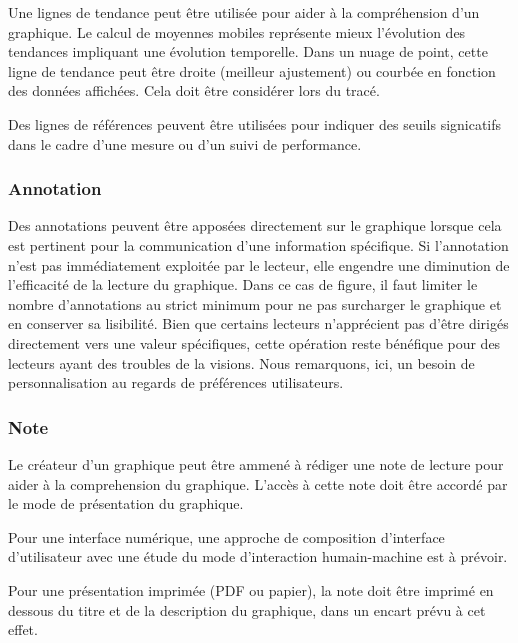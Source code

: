 \documentclass[a4paper,12pt]{article}
\begin{document}
\begin{multicols}{2}
Une lignes de tendance peut être utilisée pour aider à la compréhension d'un graphique. Le calcul de moyennes mobiles représente mieux l'évolution des tendances impliquant une évolution temporelle. Dans un nuage de point, cette ligne de tendance peut être droite (meilleur ajustement) ou courbée en fonction des données affichées. Cela doit être considérer lors du tracé. \autocite{stephenfewComponentlevelGraphDesign2012}

Des lignes de références peuvent être utilisées pour indiquer des seuils signicatifs dans le cadre d'une mesure ou d'un suivi de performance. \autocite{stephenfewComponentlevelGraphDesign2012}
\subsubsection*{Annotation}
\label{sec:org5b9bf6c}
Des annotations peuvent être apposées directement sur le graphique lorsque cela est pertinent pour la communication d'une information spécifique. Si l'annotation n'est pas immédiatement exploitée par le lecteur, elle engendre une diminution de l'efficacité de la lecture du graphique. \autocite{tranDiscoveringAccessibleData2024} Dans ce cas de figure, il faut limiter le nombre d'annotations au strict minimum pour ne pas surcharger le graphique et en conserver sa lisibilité. \autocite{stephenfewComponentlevelGraphDesign2012} Bien que certains lecteurs n'apprécient pas d'être dirigés directement vers une valeur spécifiques, \autocite{tranDiscoveringAccessibleData2024} cette opération reste bénéfique pour des lecteurs ayant des troubles de la visions. \autocite{dougschepersDesigningDataCognitive2022} Nous remarquons, ici, un besoin de personnalisation au regards de préférences utilisateurs.
\subsubsection*{Note}
\label{sec:org1886fc8}
Le créateur d'un graphique peut être ammené à rédiger une note de lecture pour aider à la comprehension du graphique. L'accès à cette note doit être accordé par le mode de présentation du graphique. \autocite{jonathanschwabishDevelopingDataVisualization2021}

Pour une interface numérique, une approche de composition d'interface d'utilisateur avec une étude du mode d'interaction humain-machine est à prévoir.

Pour une présentation imprimée (PDF ou papier), la note doit être imprimé en dessous du titre et de la description du graphique, dans un encart prévu à cet effet.

\end{multicols}
\end{document}
